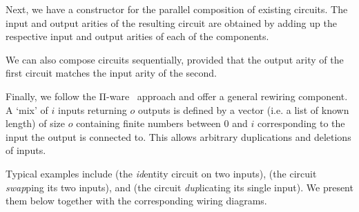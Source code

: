 
Next, we have a constructor for the parallel composition
of existing circuits. The input and output arities of the
resulting circuit are obtained by adding up the respective
input and output arities of each of the components.


We can also compose circuits sequentially, provided
that the output arity of the first circuit matches
the input arity of the second.


Finally, we follow the Π-ware~\cite{DBLP:conf/types/FlorSS15}
approach and offer a general rewiring component.
A `mix' of $i$ inputs returning $o$ outputs is defined by
a vector (i.e. a list of known length) of size $o$
containing finite numbers between $0$ and $i$
corresponding to the input the output is connected to.
%
This allows arbitrary duplications and deletions
of inputs.


Typical examples include
 (the \emph{id}entity circuit on two inputs),
 (the circuit \emph{swap}ping its two inputs),
and  (the circuit \emph{dup}licating its single input).
We present them below together with the corresponding wiring diagrams.

\noindent
\begin{minipage}{.25\textwidth}
\end{minipage}\hfill
\begin{minipage}{.125\textwidth}
\end{minipage}

\noindent
\begin{minipage}{.25\textwidth}
\end{minipage}\hfill
\begin{minipage}{.125\textwidth}
\end{minipage}


